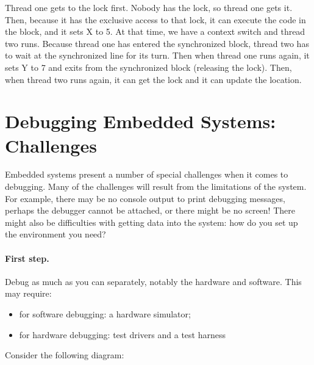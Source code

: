 Thread one gets to the lock first. Nobody has the lock, so thread one gets it. Then, because it has the exclusive access to that lock, it can execute the code in the block, and it sets X to 5. At that time, we have a context switch and thread two runs. Because thread one has entered the synchronized block, thread two has to wait at the synchronized line for its turn. Then when thread one runs again, it sets Y to 7 and exits from the synchronized block (releasing the lock). Then, when thread two runs again, it can get the lock and it can update the location.


\section*{Debugging Embedded Systems: Challenges}
Embedded systems present a number of special challenges when it comes to debugging. Many of the challenges will result from the limitations of the system. For example, there may be no console output to print debugging messages, perhaps the debugger cannot be attached, or there might be no screen! There might also be difficulties with getting data into the system: how do you set up the environment you need?

\paragraph{First step.} Debug as much as you can separately, notably the
hardware and software. This may require:
\begin{itemize}
\item for software debugging: a hardware simulator;
\item for hardware debugging: test drivers and a test harness
\end{itemize}

Consider the following diagram:

